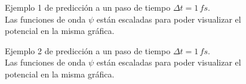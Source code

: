 \begin{figure}[H]
  \centering
  \caption{Ejemplo 1 de predicción a un paso de tiempo $\Delta t = 1\,fs$.\\ Las funciones de onda $\psi$ están escaladas para poder visualizar el potencial en la misma gráfica.}
  \label{fig:1step1}
\end{figure}

\begin{figure}[H]
  \centering
  \caption{Ejemplo 2 de predicción a un paso de tiempo $\Delta t = 1\,fs$.\\ Las funciones de onda $\psi$ están escaladas para poder visualizar el potencial en la misma gráfica.}
  \label{fig:1step2}
\end{figure}

